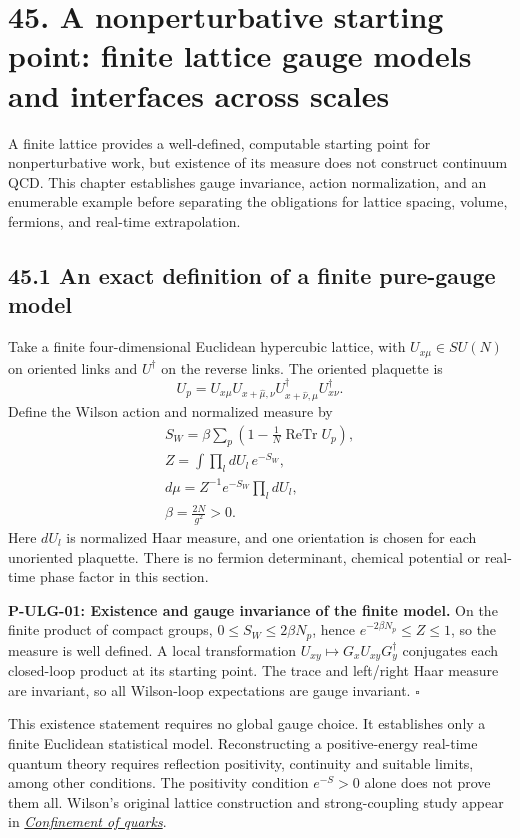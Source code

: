 \documentclass[
  11pt,
  oneside]{book}
\begin{document}
\chapter{45. A nonperturbative starting point: finite lattice gauge
models and interfaces across scales}\label{ch-45}

A finite lattice provides a well-defined, computable starting point for
nonperturbative work, but existence of its measure does not construct
continuum QCD. This chapter establishes gauge invariance, action
normalization, and an enumerable example before separating the
obligations for lattice spacing, volume, fermions, and real-time
extrapolation.

\section{45.1 An exact definition of a finite pure-gauge model}

Take a finite four-dimensional Euclidean hypercubic lattice, with
\(U_{x\mu}\in SU(N)\) on oriented links and \(U^\dagger\) on the reverse
links. The oriented plaquette is \[
U_p=U_{x\mu}U_{x+\hat\mu,\nu}U^\dagger_{x+\hat\nu,\mu}U^\dagger_{x\nu}.
\] Define the Wilson action and normalized measure by \[
\begin{gathered}
S_W=\beta\sum_p\left(1-\frac1N\operatorname{ReTr}U_p\right),
\\ Z=\int\prod_l dU_l\,e^{-S_W},\\ d\mu=Z^{-1}e^{-S_W}\prod_l dU_l,
\\\beta=\frac{2N}{g^2}>0.
\end{gathered}
\] Here \(dU_l\) is normalized Haar measure, and one orientation is
chosen for each unoriented plaquette. There is no fermion determinant,
chemical potential or real-time phase factor in this section.

\label{p-ulg-01}{}

\textbf{P-ULG-01: Existence and gauge invariance of the finite model.}
On the finite product of compact groups, \(0\le S_W\le2\beta N_p\),
hence \(e^{-2\beta N_p}\le Z\le1\), so the measure is well defined. A
local transformation \(U_{xy}\mapsto G_xU_{xy}G_y^\dagger\) conjugates
each closed-loop product at its starting point. The trace and left/right
Haar measure are invariant, so all Wilson-loop expectations are gauge
invariant. \(\square\)

This existence statement requires no global gauge choice. It establishes
only a finite Euclidean statistical model. Reconstructing a
positive-energy real-time quantum theory requires reflection positivity,
continuity and suitable limits, among other conditions. The positivity
condition \(e^{-S}>0\) alone does not prove them all. Wilson's original
lattice construction and strong-coupling study appear in
\href{https://link.aps.org/doi/10.1103/PhysRevD.10.2445}{\emph{Confinement
of quarks}}.
\end{document}
